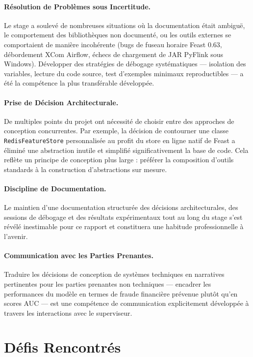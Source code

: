 \documentclass[12pt,a4paper,oneside]{book}
\theoremstyle{definition}
\theoremstyle{plain}
\begin{document}
\paragraph{Résolution de Problèmes sous Incertitude.}
Le stage a soulevé de nombreuses situations où la documentation était ambiguë, le comportement des bibliothèques non documenté, ou les outils externes se comportaient de manière incohérente (bugs de fuseau horaire Feast 0.63, débordement XCom Airflow, échecs de chargement de JAR PyFlink sous Windows). Développer des stratégies de débogage systématiques — isolation des variables, lecture du code source, test d'exemples minimaux reproductibles — a été la compétence la plus transférable développée.

\paragraph{Prise de Décision Architecturale.}
De multiples points du projet ont nécessité de choisir entre des approches de conception concurrentes. Par exemple, la décision de contourner une classe \texttt{RedisFeatureStore} personnalisée au profit du store en ligne natif de Feast a éliminé une abstraction inutile et simplifié significativement la base de code. Cela reflète un principe de conception plus large : préférer la composition d'outils standards à la construction d'abstractions sur mesure.

\paragraph{Discipline de Documentation.}
Le maintien d'une documentation structurée des décisions architecturales, des sessions de débogage et des résultats expérimentaux tout au long du stage s'est révélé inestimable pour ce rapport et constituera une habitude professionnelle à l'avenir.

\paragraph{Communication avec les Parties Prenantes.}
Traduire les décisions de conception de systèmes techniques en narratives pertinentes pour les parties prenantes non techniques — encadrer les performances du modèle en termes de fraude financière prévenue plutôt qu'en scores AUC — est une compétence de communication explicitement développée à travers les interactions avec le superviseur.

\section{Défis Rencontrés}
\end{document}
